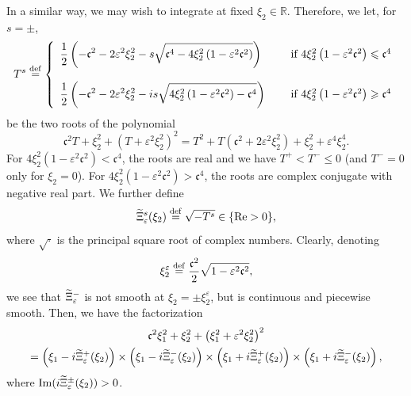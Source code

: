 \documentclass[10pt]{amsart}
\theoremstyle{definition}\newtheorem{defi}[theo]{Definition}\newtheorem{rema}[theo]{Remark}\newtheorem{exam}[theo]{Example}\newtheorem{exem}[theo]{Example}\newtheorem{nota}[theo]{Notation}
\newcommand*\R{\mathbb R}
\newcommand*\ddef{\stackrel{\rm def}{=}}
\newcommand{\Imm}{\mathrm{Im}}
\newcommand{\Rel}{\mathrm{Re}}
\newcommand*\ds{\displaystyle}
\newcommand*\cs{{\mathfrak c}}
\newcommand*\gs{\geqslant }
\newcommand*\ls{\leqslant }
\newcommand*\e{\varepsilon}
\renewcommand*\t{\tilde}
\let\oldtilde\tilde
\renewcommand*{\tilde}[1]{\mathchoice{\widetilde{#1}}{\widetilde{#1}}{\oldtilde{#1}}{\oldtilde{#1}}}
\begin{document}
In a similar way, we may wish to integrate at fixed $ \xi_2 \in \R $. Therefore, we let, for $ s = \pm $,
\[
T^s \ddef
\left\{
\begin{array}{ll}
\ds{ \frac{1}{2} \left(- \cs^2 - 2 \e^2 \xi_2^2 - s \sqrt{ \cs^4- 4 \xi_2^2 \left(1 - \e^2 \cs^2\right) } \right)} & \quad \text{ if } 4 \xi_2^2 \left(1 - \e^2 \cs^2\right) \ls \cs^4
\\ \ \\
\ds{ \frac{1}{2} \left(- \cs^2 - 2 \e^2 \xi_2^2 - i s \sqrt{ 4 \xi_2^2 \left(1 - \e^2 \cs^2\right) - \cs^4 } \right)} & \quad \text{ if } 4 \xi_2^2 \left(1 - \e^2 \cs^2\right) \gs \cs^4
\end{array}\right.
\]
be the two roots of the polynomial
\[
\cs^2 T + \xi_2^2 + \left(T + \e^2 \xi_2^2\right)^2 = T^2 + T \left(\cs^2 + 2 \e^2 \xi_2^2\right) + \xi_2^2 + \e^4 \xi_2^4.
\]
For $ 4 \xi_2^2 (1 - \e^2 \cs^2) < \cs^4 $, the roots are real and we have $ T^+ < T^- \ls 0 $ (and $ T^- = 0 $ only for $ \xi_2 = 0 $). For $ 4 \xi_2^2 (1 - \e^2 \cs^2) > \cs^4 $, the roots are complex conjugate with negative real part. We further define
\[
\t\Xi_\e^s (\xi_2) \ddef \sqrt{ - T^s } \in \{ \Rel > 0 \},
\]
where $ \sqrt{\cdot } $ is the principal square root of complex numbers. Clearly, denoting
\[
\xi_2^\e \ddef \frac{\cs^2}{2} \sqrt{ 1 - \e^2 \cs^2 },
\]
we see that $ \t\Xi_\e^- $ is not smooth at $ \xi_2 = \pm \xi_2^\e $, but is continuous and piecewise smooth. Then, we have the factorization
\begin{multline*}
\cs^2 \xi_1^2 + \xi_2^2 + \left(\xi_1^2 + \e^2 \xi_2^2\right)^2\\
= \left(\xi_1 - i \t\Xi_\e^+ (\xi_2)\right) \times \left(\xi_1 - i \t\Xi_\e^- (\xi_2)\right)
\times \left(\xi_1 + i \t\Xi_\e^+ (\xi_2)\right) \times \left(\xi_1 + i \t\Xi_\e^- (\xi_2)\right),
\end{multline*}
where $ {\Imm} (i \t\Xi_\e^\pm (\xi_2)) > 0 $.
\end{document}
